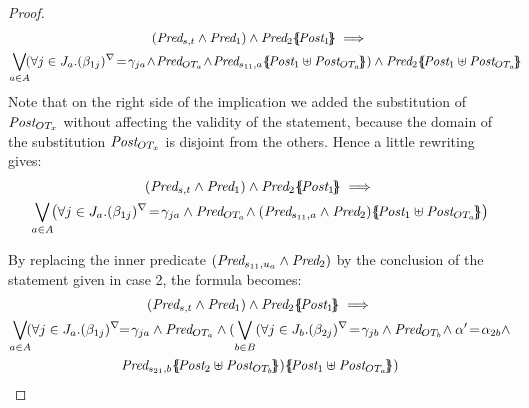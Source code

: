 \documentclass{lmcs}
\begin{document}
\begin{proof}
\begin{multline*}
(\Pred_{s,t} \land \Pred_1)\wedge\Pred_2\subst{\Post_1}\implies \\
 \bigvee_{a\in A}
  \!\! ( \forall j\in J_a. \vis{\beta_{1j}}\!=\!\gamma_{ja}\!  \land\! \Pred_{OT_a}\! \land\!
     \Pred_{s_{11},a}\subst{\Post_1\uplus\Post_{OT_a}}) \wedge \Pred_2\subst{\Post_1\uplus\Post_{OT_a}}  \hspace{-2ex}
\end{multline*}
Note that  on the right side of the implication we added  the substitution  of $\Post_{OT_x}$ without affecting the validity of the statement, because  the domain  of the substitution $\Post_{OT_x}$ is disjoint from the others. Hence a little rewriting gives:
\begin{multline*}
(\Pred_{s,t} \land \Pred_1)\wedge\Pred_2\subst{\Post_1}\implies\\
\bigvee_{a\in A}
\!\!   \left(\forall j\in J_a. \vis{\beta_{1j}}\!=\!\gamma_{ja}\land \Pred_{OT_a}
     \!\land(\Pred_{s_{11},a}\wedge\Pred_2)\subst{\Post_1\uplus\Post_{OT_a}} \right)
\end{multline*}

By replacing the inner predicate $(\Pred_{s_{11},u_a}\wedge\Pred_2)$ by the conclusion of the  statement given in case 2,  the formula becomes: 
\begin{multline*}(\Pred_{s,t} \land \Pred_1)\wedge\Pred_2\subst{\Post_1}\implies\\
{\bigvee_{a\in A}}
   \!\!(\forall j\in J_a. \vis{\beta_{1j}}\!\!=\!\gamma_{ja}  \land \Pred_{OT_a}
      \land ({\bigvee_{b\in B}}(
    \forall j\in J_{b}. \vis{\beta_{2j}}\!=\!\gamma_{jb}  \land \Pred_{OT_{b}}\!\land 
    \alpha'\!=\!\alpha_{2 b} \land\\ \Pred_{s_{21},b}\subst{\Post_2\uplus\Post_{OT_{b}}})\subst{\Post_1\uplus\Post_{OT_a}})
\end{multline*}


\end{proof}
\end{document}
